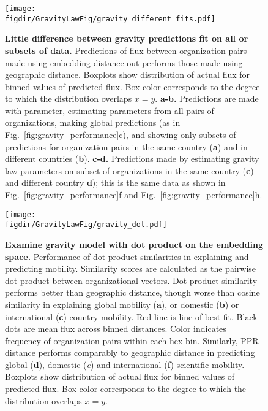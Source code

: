\documentclass[12pt]{article} %
\def\figdir{../Figs}
\begin{document}
%
%
\begin{figure}[p!]
	\centering
	\texttt{[image: \\figdir/GravityLawFig/gravity\_different\_fits.pdf]}
	\caption{
		\textbf{Little difference between gravity predictions fit on all or subsets of data.}
		Predictions of flux between organization pairs made using embedding distance out-performs those made using geographic distance.
		Boxplots show distribution of actual flux for binned values of predicted flux.
		Box color corresponds to the degree to which the distribution overlaps $x = y$.
		\textbf{a-b.} Predictions are made with parameter, estimating parameters from all pairs of organizations, making global predictions (as in Fig.~\ref{fig:gravity_performance}c), and showing only subsets of predictions for organization pairs in the same country (\textbf{a}) and in different countries (\textbf{b}).
		\textbf{c-d.} Predictions made by estimating gravity law parameters on subset of organizations in the same country (\textbf{c}) and different country \textbf{d});
		this is the same data as shown in Fig.~\ref{fig:gravity_performance}f and Fig.~\ref{fig:gravity_performance}h.
	}
	\label{fig:supp:gravity_prediction_subsets}
\end{figure}



%
%
\begin{figure}[p!]
	\centering
	\texttt{[image: \\figdir/GravityLawFig/gravity\_dot.pdf]}
	\caption{
		\textbf{Examine gravity model with dot product on the embedding space.}
		Performance of dot product similarities in explaining and predicting mobility.
		Similarity scores are calculated as the pairwise dot product between organizational vectors. 
		Dot product similarity performs better than geographic distance, though worse than cosine similarity in explaining global mobility (\textbf{a}), or domestic (\textbf{b}) or international (\textbf{c}) country mobility.
		Red line is line of best fit.
		Black dots are mean flux across binned distances.
		Color indicates frequency of organization pairs within each hex bin.
		Similarly, PPR distance performs comparably to geographic distance in predicting global (\textbf{d}), domestic (\textit{e}) and international (\textbf{f}) scientific mobility.
		Boxplots show distribution of actual flux for binned values of predicted flux.
		Box color corresponds to the degree to which the distribution overlaps $x = y$.
	}
	\label{fig:supp:gravity_dot}
\end{figure}
\end{document}
